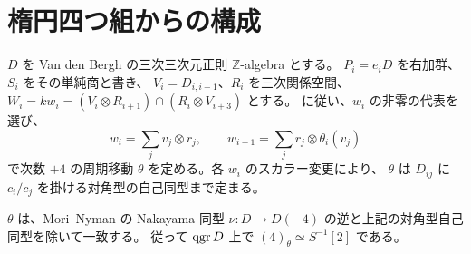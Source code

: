 
\section{楕円四つ組からの構成}
\label{sec:elliptic-inverse}

$D$ を Van den Bergh の三次三次元正則 $\mathbb Z$-algebra とする。
$P_i=e_iD$ を右加群、$S_i$ をその単純商と書き、
$V_i=D_{i,i+1}$、$R_i$ を三次関係空間、
$W_i=k w_i=(V_i\otimes R_{i+1})\cap(R_i\otimes V_{i+3})$ とする。
\cite[arXiv v3, \S 5.2]{VdB2011} に従い、$w_i$ の非零の代表を選び、
\[
 w_i=\sum_j v_j\otimes r_j,\qquad
 w_{i+1}=\sum_j r_j\otimes\theta_i(v_j)
\]
で次数 $+4$ の周期移動 $\theta$ を定める。各 $w_i$ のスカラー変更により、
$\theta$ は $D_{ij}$ に $c_i/c_j$ を掛ける対角型の自己同型まで定まる。

\begin{lemma}
\label{lem:cubic-serre-period}
$\theta$ は、Mori--Nyman の Nakayama 同型
$\nu:D\to D(-4)$ の逆と上記の対角型自己同型を除いて一致する。
従って $\operatorname{qgr} D$ 上で $(4)_\theta\simeq S^{-1}[2]$ である。
\end{lemma}

